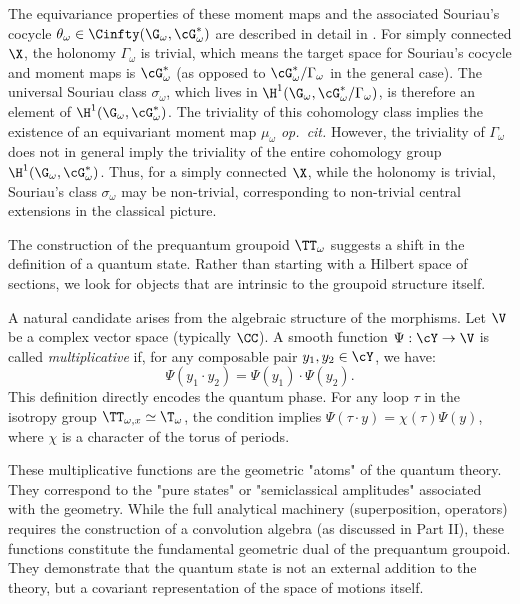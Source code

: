 \begin{article}
    The equivariance properties of these moment maps and the associated Souriau's cocycle $\theta_\omega \in \Cinfty(\G_\omega, \cG_\omega^*)$ are described in detail in \cite[Art.~5.2]{PIZ10}.
    For simply connected $\X$,
    the holonomy $\Gamma_\omega$ is trivial,
    which means the target space for Souriau's cocycle and moment maps is $\cG_\omega^*$ (as opposed to $\cG_\omega^*/\Gamma_\omega$ in the general case).
    The universal Souriau class $\sigma_\omega$,
    which lives in $\H^1(\G_\omega, \cG_\omega^*/\Gamma_\omega)$,
    is therefore an element of $\H^1(\G_\omega, \cG_\omega^*)$.
    The triviality of this cohomology class implies the existence of an equivariant moment map $\mu_\omega$ \emph{op.~cit.}
    However,
    the triviality of $\Gamma_\omega$ does not in general imply the triviality of the entire cohomology group $\H^1(\G_\omega, \cG_\omega^*)$.
    Thus,
    for a simply connected $\X$,
    while the holonomy is trivial,
    Souriau's class $\sigma_\omega$ may be non-trivial,
    corresponding to non-trivial central extensions in the classical picture.
    
  \end{article}
  
  
  \begin{article}
    \label{art:The Geometric Nature of Quantum States}
    
    The construction of the prequantum groupoid $\TT_\omega$ suggests a shift in the definition of a quantum state.
    Rather than starting with a Hilbert space of sections,
    we look for objects that are intrinsic to the groupoid structure itself.
    
    A natural candidate arises from the algebraic structure of the morphisms.
    Let $\V$ be a complex vector space (typically $\CC$).
    A smooth function $\Psi: \cY \to \V$ is called \emph{multiplicative} if,
    for any composable pair $y_1, y_2 \in \cY$,
    we have:
    $$
      \Psi(y_1 \cdot y_2) = \Psi(y_1) \cdot \Psi(y_2).
      $$
    This definition directly encodes the quantum phase.
    For any loop $\tau$ in the isotropy group $\TT_{\omega, x} \simeq \T_\omega$,
    the condition implies $\Psi(\tau \cdot y) = \chi(\tau)\Psi(y)$,
    where $\chi$ is a character of the torus of periods.
    
    These multiplicative functions are the geometric "atoms" of the quantum theory.
    They correspond to the "pure states" or "semiclassical amplitudes" associated with the geometry.
    While the full analytical machinery (superposition,
    operators) requires the construction of a convolution algebra (as discussed in Part II),
    these functions constitute the fundamental geometric dual of the prequantum groupoid.
    They demonstrate that the quantum state is not an external addition to the theory,
    but a covariant representation of the space of motions itself.
  \end{article}
  
